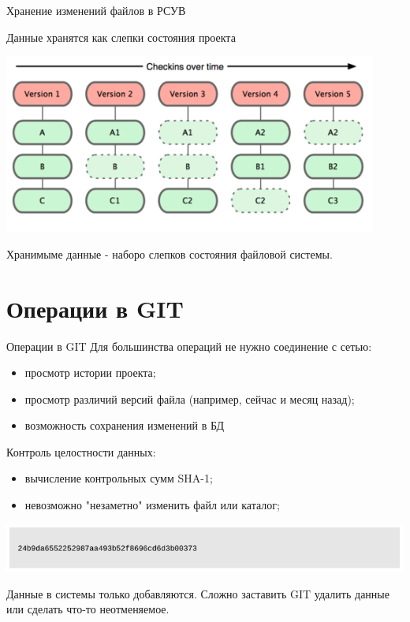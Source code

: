\documentclass{beamer}
\begin{document}
\begin{frame}{Хранение изменений файлов в РСУВ}
\begin{block}{Данные хранятся как слепки состояния проекта}
\begin{center}
\includegraphics[scale=0.7]{images/checking.png}
\end{center}
\end{block}
Хранимыме данные - наборо слепков состояния файловой системы.
\end{frame} 

\section{Операции в GIT}
\begin{frame}{Операции в GIT}
Для большинства операций не нужно соединение с сетью:
\begin{itemize}
\item просмотр истории проекта;
\item просмотр различий версий файла (например, сейчас и месяц назад);
\item возможность сохранения изменений в БД
\end{itemize}
Контроль целостности данных:
\begin{itemize}
\item вычисление контрольных сумм SHA-1;
\item невозможно "незаметно" изменить файл или каталог;
\end{itemize}
\begin{center}
\includegraphics[scale=0.5]{images/sha.png}
\end{center}
Данные в системы только добавляются. Сложно заставить GIT удалить данные или сделать что-то неотменяемое.
\end{frame} 
\end{document}
